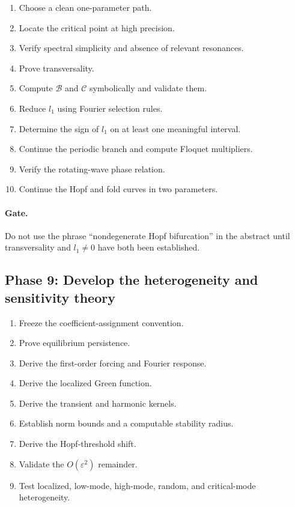 \documentclass[11pt, reqno]{amsart}
\theoremstyle{definition}
\theoremstyle{remark}
\newcommand{\eps}{\varepsilon}
\begin{document}
	\begin{enumerate}[label=8.\arabic*,leftmargin=3em]
		\item Choose a clean one-parameter path.
		\item Locate the critical point at high precision.
		\item Verify spectral simplicity and absence of relevant resonances.
		\item Prove transversality.
		\item Compute $\mathcal B$ and $\mathcal C$ symbolically and validate them.
		\item Reduce $l_1$ using Fourier selection rules.
		\item Determine the sign of $l_1$ on at least one meaningful interval.
		\item Continue the periodic branch and compute Floquet multipliers.
		\item Verify the rotating-wave phase relation.
		\item Continue the Hopf and fold curves in two parameters.
	\end{enumerate}
	
	\paragraph{Gate.}
	Do not use the phrase ``nondegenerate Hopf bifurcation'' in the abstract until
	transversality and $l_1\ne0$ have both been established.
	
	\subsection{Phase 9: Develop the heterogeneity and sensitivity theory}
	
	\begin{enumerate}[label=9.\arabic*,leftmargin=3em]
		\item Freeze the coefficient-assignment convention.
		\item Prove equilibrium persistence.
		\item Derive the first-order forcing and Fourier response.
		\item Derive the localized Green function.
		\item Derive the transient and harmonic kernels.
		\item Establish norm bounds and a computable stability radius.
		\item Derive the Hopf-threshold shift.
		\item Validate the $O(\eps^2)$ remainder.
		\item Test localized, low-mode, high-mode, random, and critical-mode
		heterogeneity.
	\end{enumerate}
	
\end{document}
